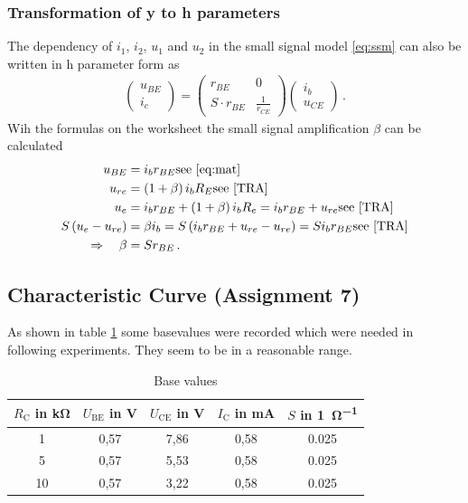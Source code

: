 \documentclass[11pt, a4paper]{article}
\begin{document}
\subsubsection{Transformation of y to h parameters}
The dependency of $i_1$, $i_2$, $u_1$ and $u_2$ in the small signal model \ref{eq:ssm} can also be written in h parameter form as
\begin{align}
    \begin{pmatrix}
        u_{BE} \\
        i_c
    \end{pmatrix}
    = 
    \begin{pmatrix}
        r_{BE} & 0 \\
        S \cdot r_{BE} & \frac{1}{r_{CE}}
    \end{pmatrix}
    \begin{pmatrix}
        i_b \\
        u_{CE}
    \end{pmatrix} \,.
    \label{eq:mat}
\end{align}
Wih the formulas on the worksheet the small signal amplification $\beta$ can be calculated
\begin{align}
    u_{BE} &= i_b r_{BE} \text{see \ref{eq:mat}}\\
    u_{re} &= \left( 1 + \beta \right) i_b R_E \text{see \cite[figure 8 and formula (24)]{TRA}}\\
    u_e &= i_b r_{BE} + \left( 1 + \beta \right) i_b R_e = i_b r_{BE} + u_{re} \text{see \cite[formula (28)]{TRA}} \\
    S\left( u_e - u_{re} \right) &= \beta i_b = S \left( i_b r_{BE} + u_{re} - u_{re} \right) = S i_b r_{BE} \text{see \cite[formula (27)]{TRA}} \\
    \Rightarrow \quad \beta &= S r_{BE} \,.
\end{align}




\FloatBarrier
\subsection{Characteristic Curve (Assignment 7)}
As shown in table \ref{tab:operating point_measurement} some basevalues were recorded which were needed in following experiments. They seem to be in a reasonable range.

\begin{table}[H]
    \centering
    \begin{tabular}{c|c|c|c|c}
    
        $R_{\text{C}}$ in \si{\kilo\ohm}  & $U_{\text{BE}}$ in \si{\volt} & $U_{\text{CE}}$ in \si{\volt} & $I_{\text{C}}$ in \si{\milli\ampere} & $S$ in \si{1\per\ohm} \\ \hline
        1 & 0,57 & 7,86 & 0,58 & 0.025\\ 
        5 & 0,57 & 5,53 & 0,58 & 0.025\\ 
        10 & 0,57 & 3,22 & 0,58 & 0.025\\ 
    \end{tabular}
    \label{tab:operating point_measurement}
    \caption{Base values}
\end{table}
\end{document}
